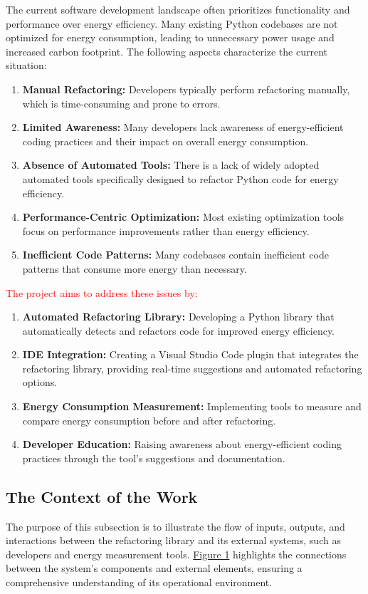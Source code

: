 \documentclass[12pt]{article}
\begin{document}
The current software development landscape often prioritizes
functionality and performance over energy efficiency. Many existing
Python codebases are not optimized for energy consumption, leading to
unnecessary power usage and increased carbon footprint. The following
aspects characterize the current situation:
\begin{enumerate}
  \item \textbf{Manual Refactoring:} Developers typically perform
    refactoring manually, which is time-consuming and prone to errors.
  \item \textbf{Limited Awareness:} Many developers lack awareness of
    energy-efficient coding practices and their impact on overall
    energy consumption.
  \item \textbf{Absence of Automated Tools:} There is a lack of
    widely adopted automated tools specifically designed to refactor
    Python code for energy efficiency.
  \item \textbf{Performance-Centric Optimization:} Most existing
    optimization tools focus on performance improvements rather than
    energy efficiency.
  \item \textbf{Inefficient Code Patterns:} Many codebases contain
    inefficient code patterns that consume more energy than necessary.
\end{enumerate}

\textcolor{red}{The project aims to address these issues by:}
\begin{enumerate}
  \item \textbf{Automated Refactoring Library:} Developing a Python
    library that automatically detects and refactors code for
    improved energy efficiency.
  \item \textbf{IDE Integration:} Creating a Visual Studio Code
    plugin that integrates the refactoring library, providing
    real-time suggestions and automated refactoring options.
  \item \textbf{Energy Consumption Measurement:} Implementing tools
    to measure and compare energy consumption before and after refactoring.
  \item \textbf{Developer Education:} Raising awareness about
    energy-efficient coding practices through the tool's suggestions
    and documentation.
\end{enumerate}

\subsection{The Context of the Work}
The purpose of this subsection is to illustrate the flow of inputs,
outputs, and interactions between the refactoring library and its
external systems, such as developers and energy measurement tools.
\hyperref[img:work-context]{Figure 1} highlights the connections between
the system's components and external elements, ensuring a comprehensive
understanding of its operational environment.
\end{document}
